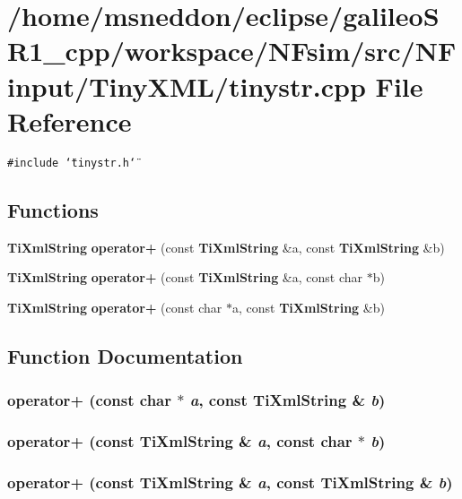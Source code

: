 \section{/home/msneddon/eclipse/galileoSR1\_\-cpp/workspace/NFsim/src/NFinput/TinyXML/tinystr.cpp File Reference}
\label{tinystr_8cpp}


{\tt \#include \char`\"{}tinystr.h\char`\"{}}\par
\subsection*{Functions}
\begin{CompactItemize}
\item 
{\bf TiXmlString} {\bf operator+} (const {\bf TiXmlString} \&a, const {\bf TiXmlString} \&b)
\item 
{\bf TiXmlString} {\bf operator+} (const {\bf TiXmlString} \&a, const char $\ast$b)
\item 
{\bf TiXmlString} {\bf operator+} (const char $\ast$a, const {\bf TiXmlString} \&b)
\end{CompactItemize}


\subsection{Function Documentation}
\subsubsection{ operator+ (const char $\ast$ {\em a}, const {\bf TiXmlString} \& {\em b})}\label{tinystr_8cpp_c0f2988a051a761664d80de81462fc4d}


\subsubsection{ operator+ (const {\bf TiXmlString} \& {\em a}, const char $\ast$ {\em b})}\label{tinystr_8cpp_b77ef9617d62643b24e52118db159b7b}


\subsubsection{ operator+ (const {\bf TiXmlString} \& {\em a}, const {\bf TiXmlString} \& {\em b})}\label{tinystr_8cpp_6ee35bce93b3aaf8a2353471c0dd2d58}


